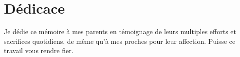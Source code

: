 \cleardoublepage
{}
{}
\chapter*{D\'edicace}
Je dédie ce mémoire à mes parents en témoignage de leurs multiples efforts et sacrifices quotidiens,
de même qu’à mes proches pour leur affection. Puisse ce travail vous rendre fier.